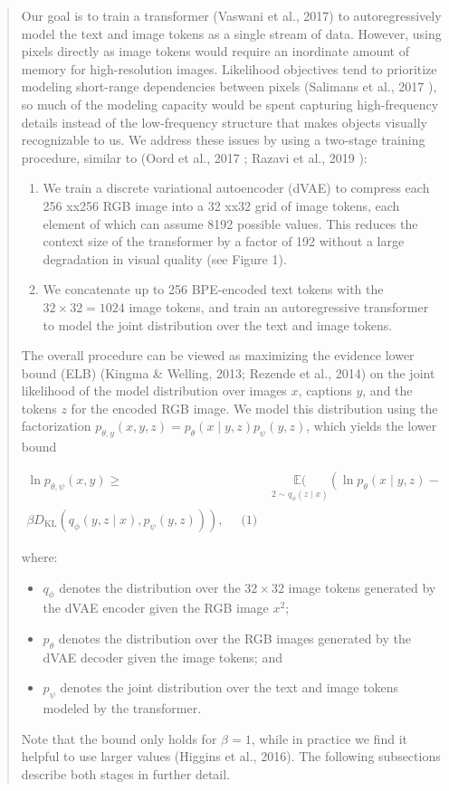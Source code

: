 \documentclass{article}
\begin{document}
\begin{appendix}
\blockquote{
Our goal is to train a transformer (Vaswani et al., 2017) to autoregressively model the text and image tokens as a single stream of data. However, using pixels directly as image tokens would require an inordinate amount of memory for high-resolution images.
Likelihood objectives tend to prioritize modeling short-range dependencies between pixels (Salimans et al., 2017 ), so much of the modeling capacity would be spent capturing high-frequency details instead of the low-frequency structure that makes objects visually recognizable to us.
We address these issues by using a two-stage training procedure, similar to (Oord et al., 2017 ; Razavi et al., 2019 ):
\begin{enumerate}
    \item We train a discrete variational autoencoder (dVAE) to compress each 256 xx256 RGB image into a 32 xx32 grid of image tokens, each element of which can assume 8192 possible values.
    This reduces the context size of the transformer by a factor of 192 without a large degradation in visual quality (see Figure 1).
    \item We concatenate up to 256 BPE-encoded text tokens with the $32 \times 32=1024$ image tokens, and train an autoregressive transformer to model the joint distribution over the text and image tokens.
\end{enumerate}

The overall procedure can be viewed as maximizing the evidence lower bound (ELB) (Kingma \& Welling, 2013; Rezende et al., 2014) on the joint likelihood of the model distribution over images $x$, captions $y$, and the tokens $z$ for the encoded RGB image.
We model this distribution using the factorization $p_{\theta, y}(x, y, z)=p_{\theta}(x \mid y, z) p_{\psi}(y, z)$, which yields the lower bound

$\begin{aligned}
\ln p_{\theta, \psi}(x, y) \geqslant & \underset{2 \sim q_{\phi}(z \mid x)}{\mathbb{E}(}\left(\ln p_{\theta}(x \mid y, z)-\right.\\
\left.\beta D_{\mathrm{KL}}\left(q_{\phi}(y, z \mid x), p_{\psi}(y, z)\right)\right), \quad \text { (1) } \end{aligned}$

where:
\begin{itemize}
    \item $q_{\phi}$ denotes the distribution over the $32 \times 32$ image tokens generated by the dVAE encoder given the RGB image $x^{2}$;
    \item $p_{\theta}$ denotes the distribution over the RGB images generated by the dVAE decoder given the image tokens; and
    \item $p_{\psi}$ denotes the joint distribution over the text and image
tokens modeled by the transformer.
\end{itemize}
Note that the bound only holds for $\beta=1$, while in practice we find it helpful to use larger values (Higgins et al., 2016). The following subsections describe both stages in further detail.
}


\end{appendix}
\end{document}
